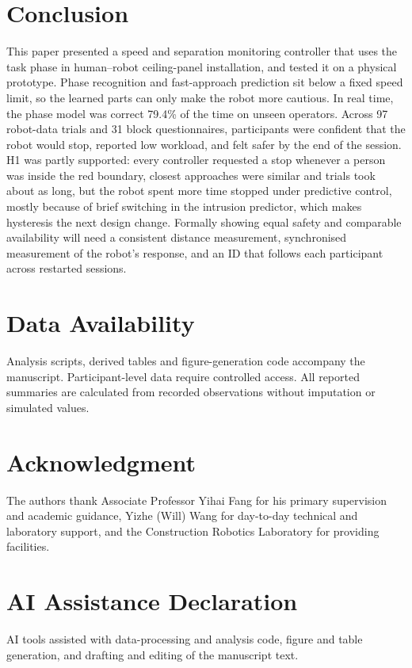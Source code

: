 \documentclass{IEEEtran}
\newcommand{\aidraft}[1]{#1}
\begin{document}
\section{Conclusion}
This paper presented a speed and separation monitoring controller that uses
the task phase in human--robot ceiling-panel installation, and tested it on a
physical prototype. Phase recognition and fast-approach prediction sit below a
fixed speed limit, so the learned parts can only make the robot more cautious.
In real time, the phase model was correct 79.4\% of the time on unseen
operators. Across 97 robot-data trials and 31 block questionnaires,
participants were confident that the robot would stop, reported low workload,
and felt safer by the end of the session. H1 was partly supported: every
controller requested a stop whenever a person was inside the red boundary,
closest approaches were similar and trials took about as long, but the robot
spent more time stopped under predictive control, mostly because of brief
switching in the intrusion predictor, which makes hysteresis the next design
change. Formally showing equal safety and comparable availability will need a
consistent distance measurement, synchronised measurement of the robot's
response, and an ID that follows each participant across restarted sessions.

\section*{Data Availability}
Analysis scripts, derived tables and figure-generation code accompany the
manuscript. Participant-level data require controlled access. All reported
summaries are calculated from recorded observations without imputation or
simulated values.

\section*{Acknowledgment}
The authors thank Associate Professor Yihai Fang for his primary supervision
and academic guidance, Yizhe (Will) Wang for day-to-day technical and laboratory
support, and the Construction Robotics Laboratory for providing facilities.

\section*{AI Assistance Declaration}
\aidraft{AI tools assisted with data-processing and analysis code, figure and
table generation, and drafting and editing of the manuscript text.}




\end{document}
